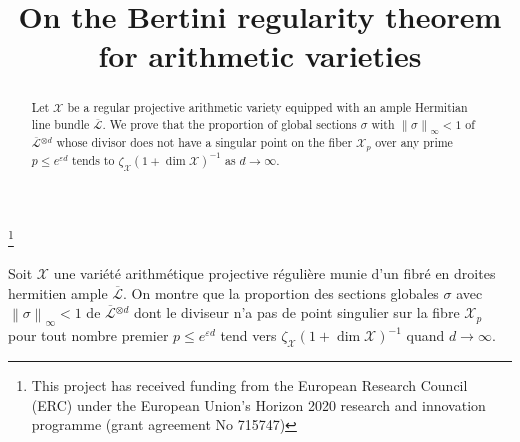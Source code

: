 \documentclass[JEP,XML,SOM,Unicode,published]{cedram}
\theoremstyle{plain}
\theoremstyle{definition}
\begin{document}
\frontmatter

\title{On the Bertini regularity theorem for arithmetic varieties}
\author[\initial{X.} \lastname{Wang}]{ }
\address{Morningside Center of Mathematics, Chinese Academy of Sciences\\
Beijing, 100190, China}
\urladdr{}

\thanks{This project has received funding from the European Research Council (ERC) under the European Union’s Horizon 2020 research and innovation programme (grant agreement No 715747)}

\begin{abstract}
Let $\mathcal{X}$ be a regular projective arithmetic variety equipped with an ample Hermitian line bundle $\overline{\mathcal{L}}$. We prove that the proportion of global sections $\sigma$ with $\left\lVert \sigma \right\rVert_{\infty}<1$ of $\overline{\mathcal{L}}{}^{\otimes d}$ whose divisor does not have a singular point on the fiber $\mathcal{X}_p$ over any prime $p\leq e^{\varepsilon d}$ tends to $\zeta_{\mathcal{X}}(1+\dim \mathcal{X})^{-1}$ as $d\to \infty$.
\end{abstract}





\begin{altabstract}
Soit $\mathcal{X}$ une variété arithmétique projective régulière munie d'un fibré en droites hermitien ample $\overline{\mathcal{L}}$. On montre que la proportion des sections globales $\sigma$ avec $\left\lVert \sigma \right\rVert_{\infty}<1$ de $\overline{\mathcal{L}}{}^{\otimes d}$ dont le diviseur n'a pas de point singulier sur la fibre $\mathcal{X}_p$ pour tout nombre premier $p\leq e^{\varepsilon d}$ tend vers $\zeta_{\mathcal{X}}(1+\dim \mathcal{X})^{-1}$ quand $d\to \infty$.
\end{altabstract}

\maketitle
\vspace*{-\baselineskip}
\tableofcontents
\mainmatter
\end{document}

